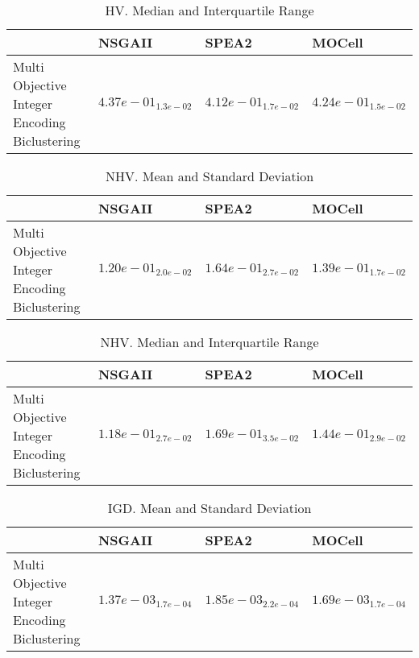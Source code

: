 \documentclass{article}
\begin{document}
\begin{table}
\caption{HV. Median and Interquartile Range}
\label{table: HV}
\centering
\begin{scriptsize}
\begin{tabular}{llll}
\hline & NSGAII & SPEA2 &  MOCell\\
\hline 
Multi Objective Integer Encoding Biclustering & \cellcolor{gray95}$  4.37e-01_{ 1.3e-02}$ & $  4.12e-01_{ 1.7e-02}$ & \cellcolor{gray25}$  4.24e-01_{ 1.5e-02}$ \\
\hline
\end{tabular}
\end{scriptsize}
\end{table}

\begin{table}
\caption{NHV. Mean and Standard Deviation}
\label{table: NHV}
\centering
\begin{scriptsize}
\begin{tabular}{llll}
\hline & NSGAII & SPEA2 &  MOCell\\
\hline 
Multi Objective Integer Encoding Biclustering & \cellcolor{gray95}$  1.20e-01_{ 2.0e-02}$ & $  1.64e-01_{ 2.7e-02}$ & \cellcolor{gray25}$  1.39e-01_{ 1.7e-02}$ \\
\hline
\end{tabular}
\end{scriptsize}
\end{table}

\begin{table}
\caption{NHV. Median and Interquartile Range}
\label{table: NHV}
\centering
\begin{scriptsize}
\begin{tabular}{llll}
\hline & NSGAII & SPEA2 &  MOCell\\
\hline 
Multi Objective Integer Encoding Biclustering & \cellcolor{gray95}$  1.18e-01_{ 2.7e-02}$ & $  1.69e-01_{ 3.5e-02}$ & \cellcolor{gray25}$  1.44e-01_{ 2.9e-02}$ \\
\hline
\end{tabular}
\end{scriptsize}
\end{table}

\begin{table}
\caption{IGD. Mean and Standard Deviation}
\label{table: IGD}
\centering
\begin{scriptsize}
\begin{tabular}{llll}
\hline & NSGAII & SPEA2 &  MOCell\\
\hline 
Multi Objective Integer Encoding Biclustering & \cellcolor{gray95}$  1.37e-03_{ 1.7e-04}$ & $  1.85e-03_{ 2.2e-04}$ & \cellcolor{gray25}$  1.69e-03_{ 1.7e-04}$ \\
\hline
\end{tabular}
\end{scriptsize}
\end{table}
\end{document}
